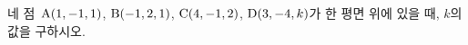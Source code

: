 네 점~$\mathrm{A}(1{,}\mkern3mu\mathopen{}-1{,}\mkern3mu\mathopen{}1)$, $\mathrm{B}(-1{,}\mkern3mu\mathopen{}2{,}\mkern3mu\mathopen{}1)$, $\mathrm{C}(4{,}\mkern3mu\mathopen{}-1{,}\mkern3mu\mathopen{}2)$, $\mathrm{D}(3{,}\mkern3mu\mathopen{}-4{,}\mkern3mu\mathopen{}k)$가 한 평면 위에 있을 때, $k$의 값을 구하시오.

